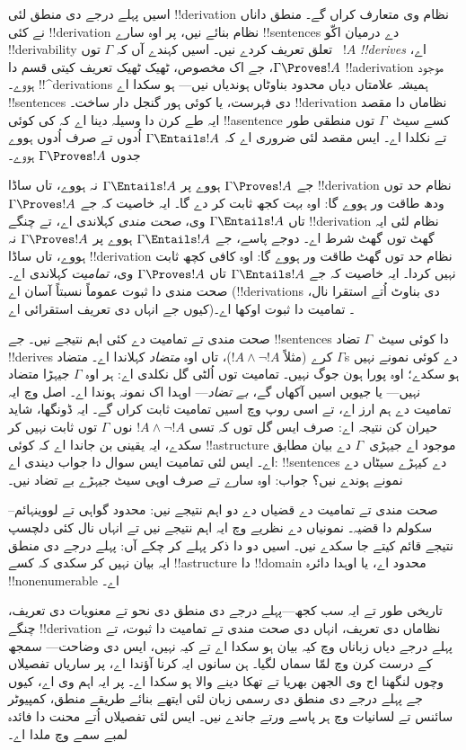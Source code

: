 \documentclass[../../../include/open-logic-section]{subfiles}
\begin{document}


اسیں پہلے درجے دی منطق لئی
!!{derivation} نظام وی متعارف
کراں گے۔ منطق داناں نے کئی
!!{derivation} نظام بنائے نیں،
پر اوہ سارے !!{sentence}s دے
درمیان اکّو !!{derivability}
تعلق تعریف کردے نیں۔ اسیں کہندے
آں کہ $\Gamma$ توں
~$!A$ \emph{!!{derive}s}
اے، $\Gamma \Proves !A$،
جے اک مخصوص، ٹھیک ٹھیک
تعریف کیتی قسم دا
!!a{derivation} موجود ہووے۔
!!^{derivation}s ہمیشہ
علامتاں دیاں محدود
بناوٹاں ہوندیاں نیں---
ہو سکدا اے !!{sentence}s
دی فہرست، یا کوئی ہور
گنجل دار ساخت۔ !!{derivation}
نظاماں دا مقصد ایہ طے
کرن دا وسیلہ دینا اے کہ
کی کوئی !!a{sentence}
کسے سیٹ~$\Gamma$ توں
منطقی طور تے نکلدا اے۔
ایس مقصد لئی ضروری اے
کہ $\Gamma \Entails !A$
اُدوں تے صرف اُدوں
ہووے جدوں $\Gamma
\Proves !A$ ہووے۔

جے $\Gamma \Proves !A$
ہووے پر $\Gamma \Entails !A$
نہ ہووے، تاں ساڈا
!!{derivation} نظام حد توں
ودھ طاقت ور ہووے گا:
اوہ بہت کجھ ثابت کر دے
گا۔ ایہ خاصیت کہ جے
$\Gamma
\Proves !A$ تاں
$\Gamma \Entails !A$
وی، \emph{صحت مندی}
کہلاندی اے، تے چنگے
!!{derivation} نظام لئی
ایہ گھٹ توں گھٹ شرط
اے۔ دوجے پاسے، جے
$\Gamma \Entails !A$
ہووے پر $\Gamma \Proves !A$
نہ ہووے، تاں ساڈا
!!{derivation} نظام حد توں
گھٹ طاقت ور ہووے گا:
اوہ کافی کچھ ثابت نہیں
کردا۔ ایہ خاصیت کہ جے
$\Gamma \Entails !A$
تاں $\Gamma \Proves !A$
وی، \emph{تمامیت}
کہلاندی اے۔ صحت مندی
دا ثبوت عموماً نسبتاً
آسان اے (!!{derivation}s
دی بناوٹ اُتے استقرا نال،
کیوں جے انہاں دی تعریف
استقرائی اے)۔ تمامیت دا
ثبوت اوکھا اے۔

صحت مندی تے تمامیت دے
کئی اہم نتیجے نیں۔ جے
!!{sentence}s دا کوئی
سیٹ~$\Gamma$ تضاد
!!{derive}s کرے (مثلاً
$!A \land \lnot !A$)،
تاں اوہ \emph{متضاد}
کہلاندا اے۔ متضاد
$\Gamma$s دے کوئی
نمونے نہیں ہو سکدے؛
اوہ پورا ہون جوگ
نہیں۔ تمامیت توں
اُلٹی گل نکلدی اے:
ہر اوہ $\Gamma$
جیہڑا متضاد نہیں---
یا جیویں اسیں آکھاں
گے، \emph{بے تضاد}---
اوہدا اک نمونہ ہوندا
اے۔ اصل وچ ایہ تمامیت
دے ہم ارز اے، تے
اسی روپ وچ اسیں
تمامیت ثابت کراں گے۔
ایہ ڈونگھا، شاید
حیران کن نتیجہ اے:
صرف ایس گل توں کہ
تسی $!A \land \lnot !A$
نوں $\Gamma$ توں
ثابت نہیں کر سکدے،
ایہ یقینی بن جاندا
اے کہ کوئی
!!a{structure} موجود
اے جیہڑی~$\Gamma$
دے بیان مطابق اے۔
ایس لئی تمامیت
ایس سوال دا جواب
دیندی اے: !!{sentence}s
دے کیہڑے سیٹاں دے
نمونے ہوندے نیں؟
جواب: اوہ سارے
تے صرف اوہی سیٹ
جیہڑے بے تضاد نیں۔

صحت مندی تے تمامیت
دے قضیاں دے دو
اہم نتیجے نیں: محدود
گواہی تے لووینہائم--سکولم
دا قضیہ۔ نمونیاں دے
نظریے وچ ایہ اہم
نتیجے نیں تے انہاں
نال کئی دلچسپ نتیجے
قائم کیتے جا سکدے
نیں۔ اسیں دو دا
ذکر پہلے کر چکے آں:
پہلے درجے دی منطق
ایہ بیان نہیں کر
سکدی کہ کسے
!!a{structure} دا
!!{domain} محدود
اے، یا اوہدا دائرہ
!!{nonenumerable}
اے۔

تاریخی طور تے ایہ
سب کجھ---پہلے درجے
دی منطق دی نحو تے
معنویات دی تعریف،
چنگے !!{derivation}
نظاماں دی تعریف،
انہاں دی صحت مندی
تے تمامیت دا ثبوت،
تے پہلے درجے دیاں
زباناں وچ کیہ بیان
ہو سکدا اے تے کیہ
نہیں، ایس دی وضاحت---
سمجھ کے درست کرن
وچ لمّا سماں لگیا۔
ہن سانوں ایہ کرنا
آؤندا اے، پر ساریاں
تفصیلاں وچوں لنگھنا
اج وی الجھن بھریا
تے تھکا دینے والا
ہو سکدا اے۔ پر
ایہ اہم وی اے،
کیوں جے پہلے درجے
دی منطق دی رسمی
زبان لئی ایتھے
بنائے طریقے منطق،
کمپیوٹر سائنس
تے لسانیات وچ
ہر پاسے ورتے
جاندے نیں۔ ایس لئی
تفصیلاں اُتے محنت
دا فائدہ لمبے
سمے وچ ملدا اے۔
\end{document}
